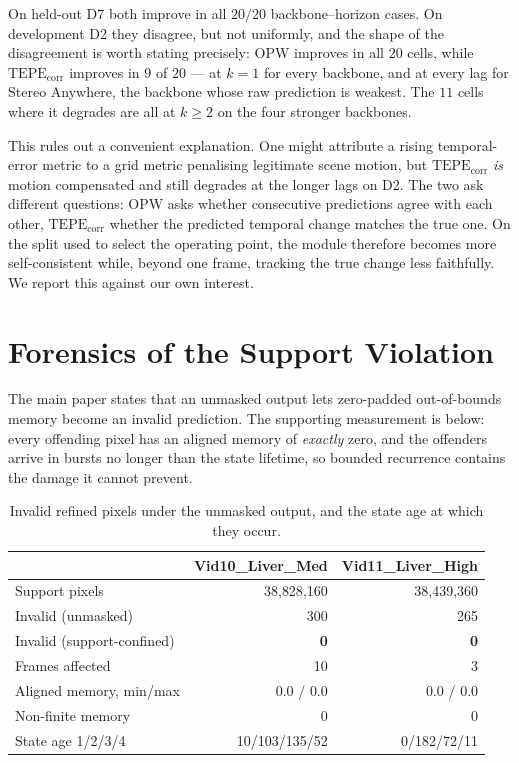 \documentclass[letterpaper,10pt,conference]{ieeeconf}
\newcommand{\TEPE}{\mathrm{TEPE}}
\begin{document}
On held-out D7 both improve in all $20/20$ backbone--horizon cases. On
development D2 they disagree, but not uniformly, and the shape of the
disagreement is worth stating precisely: OPW improves in all $20$ cells, while
$\TEPE_{\mathrm{corr}}$ improves in $9$ of $20$ --- at $k{=}1$ for every
backbone, and at every lag for Stereo Anywhere, the backbone whose raw
prediction is weakest. The $11$ cells where it degrades are all at $k\geq2$ on
the four stronger backbones.

This rules out a convenient explanation. One might attribute a rising
temporal-error metric to a grid metric penalising legitimate scene motion, but
$\TEPE_{\mathrm{corr}}$ \emph{is} motion compensated and still degrades at the
longer lags on D2. The two ask different questions: OPW asks whether
consecutive predictions agree with each other, $\TEPE_{\mathrm{corr}}$
whether the predicted temporal change matches the true one. On the split
used to select the operating point, the module therefore becomes more
self-consistent while, beyond one frame, tracking the true change less
faithfully. We report this against our own interest.

\section{Forensics of the Support Violation}

The main paper states that an unmasked output lets zero-padded
out-of-bounds memory become an invalid prediction. The supporting
measurement is below: every offending pixel has an aligned memory of
\emph{exactly} zero, and the offenders arrive in bursts no longer than
the state lifetime, so bounded recurrence contains the damage it cannot
prevent.

\begin{table}[htb]
\centering
\small
\caption{Invalid refined pixels under the unmasked output, and the state
age at which they occur.}
\label{sup:forensics}
\begin{tabular}{lrr}
\toprule
& Vid10\_Liver\_Med & Vid11\_Liver\_High \\
\midrule
Support pixels        & 38{,}828{,}160 & 38{,}439{,}360 \\
Invalid (unmasked)    & 300 & 265 \\
Invalid (support-confined) & \textbf{0} & \textbf{0} \\
Frames affected       & 10 & 3 \\
Aligned memory, min/max & $0.0$ / $0.0$ & $0.0$ / $0.0$ \\
Non-finite memory     & 0 & 0 \\
State age 1/2/3/4     & 10/103/135/52 & 0/182/72/11 \\
\bottomrule
\end{tabular}
\end{table}
\end{document}
